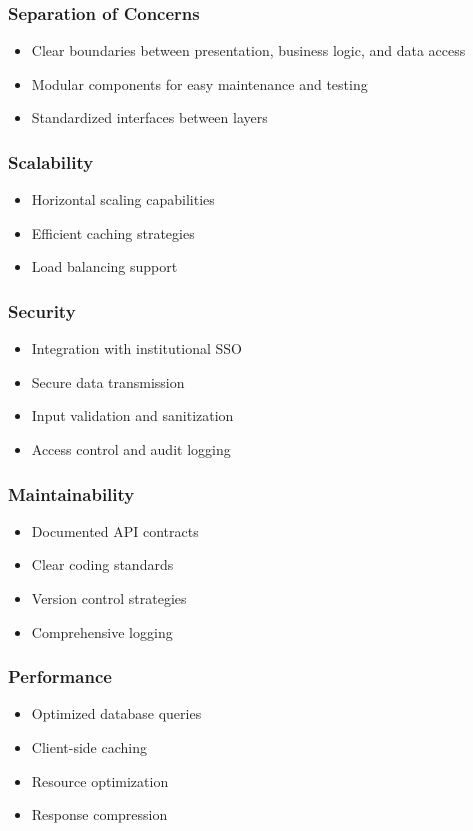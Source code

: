 \subsubsection{Separation of Concerns}
\begin{itemize}
    \item Clear boundaries between presentation, business logic, and data access
    \item Modular components for easy maintenance and testing
    \item Standardized interfaces between layers
\end{itemize}

\begin{multicols}{2}
\subsubsection{Scalability}
\begin{itemize}
    \item Horizontal scaling capabilities
    \item Efficient caching strategies
    \item Load balancing support
\end{itemize}

\subsubsection{Security}
\begin{itemize}
    \item Integration with institutional SSO
    \item Secure data transmission
    \item Input validation and sanitization
    \item Access control and audit logging
\end{itemize}

\subsubsection{Maintainability}
\begin{itemize}
    \item Documented API contracts
    \item Clear coding standards
    \item Version control strategies
    \item Comprehensive logging
\end{itemize}

\subsubsection{Performance}
\begin{itemize}
    \item Optimized database queries
    \item Client-side caching
    \item Resource optimization
    \item Response compression
\end{itemize}
\end{multicols}

